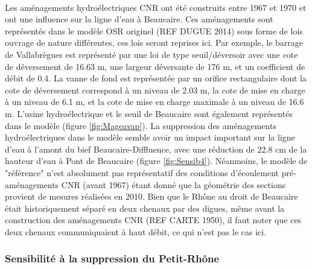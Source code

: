 \documentclass[11pt]{article}
\begin{document}
		\paragraph{} Les aménagements hydroélectriques CNR ont été construits entre 1967 et 1970 et ont une influence sur la ligne d'eau à Beaucaire. Ces aménagements sont représentés dans le modèle OSR originel (REF DUGUE 2014) sous forme de lois ouvrage de nature différentes, ces lois seront reprises ici. Par exemple, le barrage de Vallabrègues est représenté par une loi de type seuil/déversoir avec une cote de déversement de 16.63 m, une largeur déversante de 176 m, et un coefficient de débit de 0.4. La vanne de fond est représentée par un orifice rectangulaire dont la cote de déversement correspond à un niveau de 2.03 m, la cote de mise en charge à un niveau de 6.1 m, et la cote de mise en charge maximale à un niveau de 16.6 m. L'usine hydroélectrique et le seuil de Beaucaire sont également représentés dans le modèle (figure \ref{fig:Mageavap}). La suppression des aménagements hydroélectriques dans le modèle semble avoir un impact important sur la ligne d'eau à l'amont du bief Beaucaire-Diffluence, avec une réduction de 22.8 cm de la hauteur d'eau à Pont de Beaucaire (figure \ref{fig:Sensib4}). Néanmoins, le modèle de "référence" n'est absolument pas représentatif des conditions d'écoulement pré-aménagements CNR (avant 1967) étant donné que la géométrie des sections provient de mesures réalisées en 2010. Bien que le Rhône au droit de Beaucaire était historiquement séparé en deux chenaux par des digues, même avant la construction des aménagements CNR (REF CARTE 1950), il faut noter que ces deux chenaux communiquaient à haut débit, ce qui n'est pas le cas ici. 
	
	\subsubsection{Sensibilité à la suppression du Petit-Rhône} 
	
\end{document}

